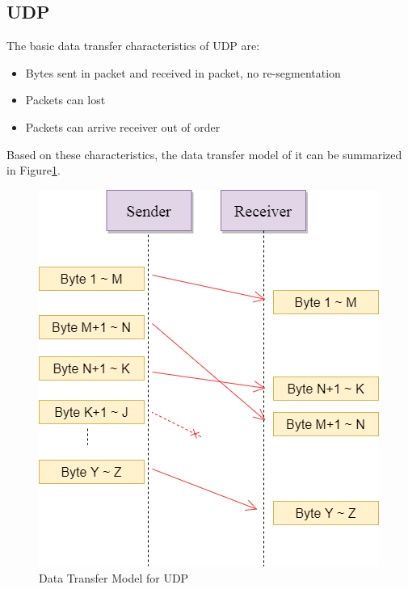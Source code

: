\subsection{UDP}
The basic data transfer characteristics of UDP are:
\begin{itemize}
  \item Bytes sent in packet and received in packet, no re-segmentation
  \item Packets can lost
  \item Packets can arrive receiver out of order
\end{itemize}
Based on these characteristics, the data transfer model of it can be summarized in Figure\ref{upd}.
\begin{figure}[H]
\centerline{\includegraphics[scale=0.48]{Figures/udp}}
 \caption{Data Transfer Model for UDP}
\label{upd}
\end{figure}

